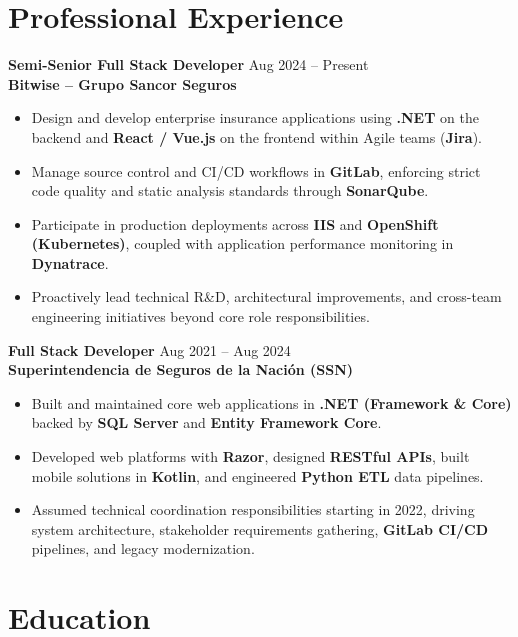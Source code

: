 \documentclass[10pt,a4paper]{article}
\newcommand{\cvjob}[4]{
  {\normalsize\bfseries\color{darktext}#1} \hfill {\footnotesize\color{mutedtext}#3}\\[1pt]
  {\small\bfseries\color{primary}#2}\\[2pt]
  {\footnotesize\color{darktext}#4}\vspace{5pt}
}
\begin{document}
\noindent\hspace*{0.9cm}%
\begin{minipage}[t]{11.9cm}

\section{Professional Experience}

\cvjob{Semi-Senior Full Stack Developer}{Bitwise -- Grupo Sancor Seguros}{Aug 2024 -- Present}{
  \begin{itemize}[leftmargin=1.2em, itemsep=1.5pt, topsep=1pt, parsep=0pt]
    \item Design and develop enterprise insurance applications using \textbf{.NET} on the backend and \textbf{React / Vue.js} on the frontend within Agile teams (\textbf{Jira}).
    \item Manage source control and CI/CD workflows in \textbf{GitLab}, enforcing strict code quality and static analysis standards through \textbf{SonarQube}.
    \item Participate in production deployments across \textbf{IIS} and \textbf{OpenShift (Kubernetes)}, coupled with application performance monitoring in \textbf{Dynatrace}.
    \item Proactively lead technical R\&D, architectural improvements, and cross-team engineering initiatives beyond core role responsibilities.
  \end{itemize}
}

\cvjob{Full Stack Developer}{Superintendencia de Seguros de la Nación (SSN)}{Aug 2021 -- Aug 2024}{
  \begin{itemize}[leftmargin=1.2em, itemsep=1.5pt, topsep=1pt, parsep=0pt]
    \item Built and maintained core web applications in \textbf{.NET (Framework \& Core)} backed by \textbf{SQL Server} and \textbf{Entity Framework Core}.
    \item Developed web platforms with \textbf{Razor}, designed \textbf{RESTful APIs}, built mobile solutions in \textbf{Kotlin}, and engineered \textbf{Python ETL} data pipelines.
    \item Assumed technical coordination responsibilities starting in 2022, driving system architecture, stakeholder requirements gathering, \textbf{GitLab CI/CD} pipelines, and legacy modernization.
  \end{itemize}
}

\section{Education}


\end{minipage}
\end{document}
